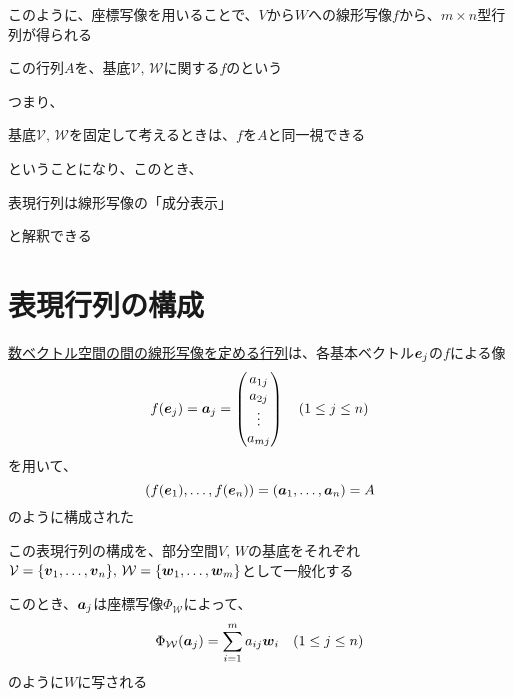 \documentclass[../../../topic_linear-algebra]{subfiles}
\begin{document}
\sectionline

このように、座標写像を用いることで、$V$から$W$への線形写像$f$から、$m \times n$型行列が得られる

この行列$A$を、基底$\mathcal{V}, \, \mathcal{W}$に関する$f$のという

\br

つまり、
\begin{shaded}
  基底$\mathcal{V}, \, \mathcal{W}$を固定して考えるときは、$f$を$A$と同一視できる
\end{shaded}
ということになり、このとき、
\begin{shaded}
  表現行列は線形写像の「成分表示」
\end{shaded}
と解釈できる

\sectionline
\section{表現行列の構成}

\hyperref[sec:matrix-rep-of-linear-maps]{数ベクトル空間の間の線形写像を定める行列}は、各基本ベクトル$\vb*{e}_j$の$f$による像
\begin{equation*}
  f(\vb*{e}_j) = \vb*{a}_j = \begin{pmatrix}
    a_{1j} \\
    a_{2j} \\
    \vdots \\
    a_{mj}
  \end{pmatrix} \quad (1 \leq j \leq n)
\end{equation*}
を用いて、
\begin{equation*}
  \left( f(\vb*{e}_1), \ldots, f(\vb*{e}_n) \right) = \left( \vb*{a}_1, \ldots, \vb*{a}_n \right) = A
\end{equation*}
のように構成された

\br

この表現行列の構成を、部分空間$V,\,W$の基底をそれぞれ$\mathcal{V} = \{ \vb*{v}_1,\ldots, \vb*{v}_n\}, \, \mathcal{W} = \{\vb*{w}_1, \ldots, \vb*{w}_m\}$として一般化する

\br

このとき、$\vb*{a}_j$は座標写像$\Phi_{\mathcal{W}}$によって、
\begin{equation*}
  \Phi_{\mathcal{W}}(\vb*{a}_j) = \sum_{i=1}^m a_{ij} \vb*{w}_i \quad (1 \leq j \leq n)
\end{equation*}
のように$W$に写される
\end{document}
